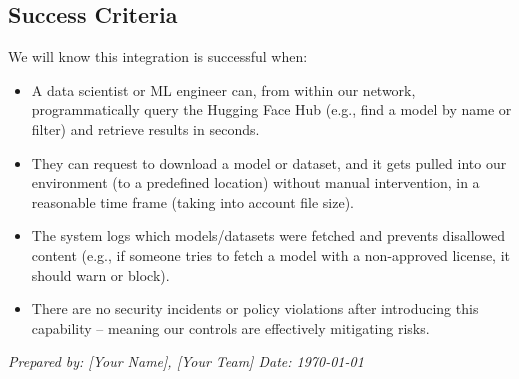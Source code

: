 \documentclass{article}
\begin{document}
\subsection*{Success Criteria}
We will know this integration is successful when:
\begin{itemize}
    \item A data scientist or ML engineer can, from within our network, programmatically query the Hugging Face Hub (e.g., find a model by name or filter) and retrieve results in seconds.
    \item They can request to download a model or dataset, and it gets pulled into our environment (to a predefined location) without manual intervention, in a reasonable time frame (taking into account file size).
    \item The system logs which models/datasets were fetched and prevents disallowed content (e.g., if someone tries to fetch a model with a non-approved license, it should warn or block).
    \item There are no security incidents or policy violations after introducing this capability – meaning our controls are effectively mitigating risks.
\end{itemize}

\vspace{1em}

\noindent \textit{Prepared by: [Your Name], [Your Team] \hfill Date: \today}
\end{document}

